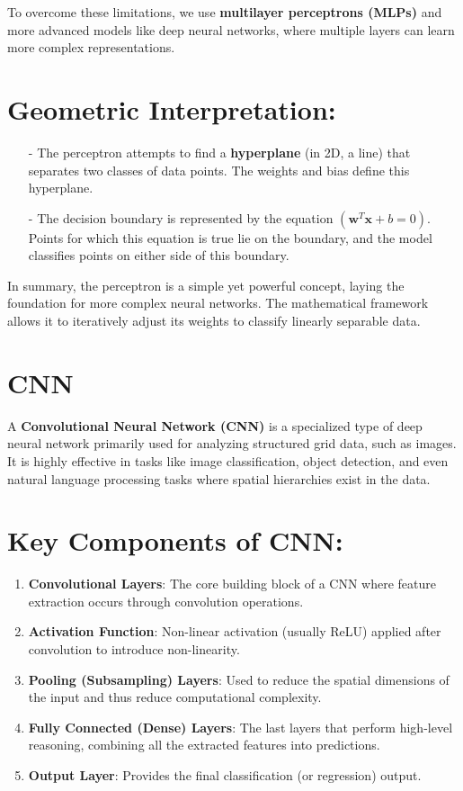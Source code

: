 \documentclass[10pt]{article}
\begin{document}
To overcome these limitations, we use {\bf multilayer perceptrons (MLPs)} and more advanced models like deep neural networks, where multiple layers can learn more complex representations.

\section{ Geometric Interpretation:}
\begin{itemize}
   \item [-] The perceptron attempts to find a {\bf hyperplane} (in 2D, a line) that separates two classes of data points. The weights and bias define this hyperplane.
   \item [-] The decision boundary is represented by the equation $( \mathbf{w}^T \mathbf{x} + b = 0 )$. Points for which this equation is true lie on the boundary, and the model classifies points on either side of this boundary.
\end{itemize}

In summary, the perceptron is a simple yet powerful concept, laying the foundation for more complex neural networks. The mathematical framework allows it to iteratively adjust its weights to classify linearly separable data.


\section {CNN}

A {\bf Convolutional Neural Network (CNN)} is a specialized type of deep neural network primarily used for analyzing structured grid data, such as images. It is highly effective in tasks like image classification, object detection, and even natural language processing tasks where spatial hierarchies exist in the data. 

\section{ Key Components of CNN:}
\begin{enumerate}
   \item {\bf Convolutional Layers}: The core building block of a CNN where feature extraction occurs through convolution operations.
   \item {\bf Activation Function}: Non-linear activation (usually ReLU) applied after convolution to introduce non-linearity.
   \item {\bf Pooling (Subsampling) Layers}: Used to reduce the spatial dimensions of the input and thus reduce computational complexity.
   \item {\bf Fully Connected (Dense) Layers}: The last layers that perform high-level reasoning, combining all the extracted features into predictions.
   \item {\bf Output Layer}: Provides the final classification (or regression) output.
\end{enumerate}
\end{document}
